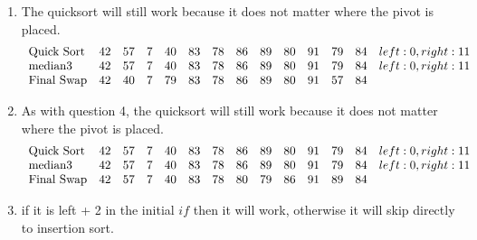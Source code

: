 \documentclass[10pt]{article}
\begin{document}
\begin{enumerate}
\item The quicksort will still work because it does not matter where the pivot is placed.
\[
\begin{array}{lccccccccccccc}
$Quick Sort$ & 42 & 57 & 7 & 40 & 83 & 78 & 86 & 89 & 80 & 91 & 79 & 84 & left: 0, right: 11\\
$median3$ & 42 & 57 & 7 & 40 & 83 & 78 & 86 & 89 & 80 & 91 & 79 & 84 & left: 0, right: 11\\
$Final Swap$& 42 & 40 & 7 & 79 & 83 & 78 & 86 & 89 & 80 & 91 & 57 & 84 \\
\end{array}
\]
  \item As with question 4, the quicksort will still work because it does not matter where the pivot is placed.
\[
\begin{array}{lccccccccccccc}
$Quick Sort$ & 42 & 57 & 7 & 40 & 83 & 78 & 86 & 89 & 80 & 91 & 79 & 84 & left: 0, right: 11\\
$median3$ & 42 & 57 & 7 & 40 & 83 & 78 & 86 & 89 & 80 & 91 & 79 & 84 & left: 0, right: 11\\
$Final Swap$& 42 & 57 & 7 & 40 & 83 & 78 & 80 & 79 & 86 & 91 & 89 & 84 \\
\end{array}
\]

\item if it is left + 2 in the initial $if$ then it will work, otherwise it will skip directly to insertion sort.

\end{enumerate}
\end{document}
